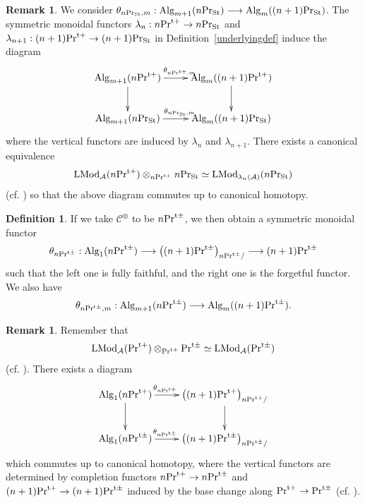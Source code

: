 \documentclass[leqno,12pt]{amsart}
\theoremstyle{plain}
\theoremstyle{definition}
\newtheorem{Definition}[Theorem]{Definition}
\newtheorem{Remark}[Theorem]{Remark}
\newcommand{\CCC}{\mathcal{C}}
\newcommand{\PR}{\textup{Pr}}
\newcommand{\PRTT}{\textup{Pr}^{\textup{t}+}}
\newcommand{\PRTTT}{\textup{Pr}^{\textup{t}\pm}}
\newcommand{\Alg}{\operatorname{Alg}}
\newcommand{\PRST}{\PR_{\textup{St}}}
\newcommand{\LMod}{\operatorname{LMod}}
\begin{document}
\begin{Remark}
\label{undermodule}
We consider $\theta_{n\PRST,m}:\Alg_{m+1}(n\PRST) \longrightarrow \Alg_{m}((n+1)\PRST)$.
The symmetric monoidal functors $\lambda_n:n\PRTT\to n\PRST$ and $\lambda_{n+1}:(n+1)\PRTT\to (n+1)\PRST$ in Definition~\ref{underlyingdef}
induce the diagram
\[
\xymatrix{
\Alg_{m+1}(n\PRTT) \ar[r]^{\theta_{n\PRTT,m}} \ar[d]& \Alg_{m}((n+1)\PRTT) \ar[d] \\
\Alg_{m+1}(n\PRST) \ar[r]^{\theta_{n\PRST,m}} & \Alg_{m}((n+1)\PRST)
}
\]
where the vertical functors are induced by $\lambda_n$ and $\lambda_{n+1}$.
There exists a canonical equivalence
\[
\LMod_{\mathcal{A}}(n\PRTT)\otimes_{n\PRTT}n\PRST\simeq \LMod_{\lambda_{n}(\mathcal{A})}(n\PRST)
\]
(cf. \cite[4.8.4.6]{HA})
so that 
the above diagram commutes up to canonical homotopy.
\end{Remark}

\begin{Definition}
If we take $\CCC^\otimes$ to be $n\PRTTT$, we then obtain a symmetric monoidal functor
\[
\theta_{n\PRTTT}:\Alg_1(n\PRTTT) \longrightarrow \big{(}(n+1)\PRTTT\big{)}_{n\PRTTT/}\longrightarrow (n+1)\PRTTT
\]
such that the left one is fully faithful, and the right one is the forgetful functor.
We also have
\[
\theta_{n\PRTTT,m}:\Alg_{m+1}(n\PRTTT) \longrightarrow \Alg_{m}((n+1)\PRTTT).
\]
\end{Definition}



\begin{Remark}
\label{comptheta}
Remember that 
\[
\LMod_{\mathcal{A}}(\PRTT)\otimes_{\PRTT}\PRTTT\simeq \LMod_{\mathcal{A}}(\PRTTT)
\]
(cf. \cite[4.8.4.6]{HA}).
There exists a diagram
\[
\xymatrix{
\Alg_{1}(n\PRTT) \ar[r]^(0.4){\theta_{n\PRTT}} \ar[d] & \big{(}(n+1)\PRTT\big{)}_{n\PRTT/} \ar[d] \\
\Alg_1(n\PRTTT) \ar[r]^(0.4){\theta_{n\PRTTT}} & \big{(}(n+1)\PRTTT\big{)}_{n\PRTTT/}
}
\]
which commutes up to canonical homotopy, where the vertical functors are determined by
completion functors $n\PRTT\to n\PRTTT$ and $(n+1)\PRTT\to (n+1)\PRTTT$
induced by the base change along $\PRTT\to \PRTTT$ (cf. \cite[4.8.5.1]{HA}).
\end{Remark}
\end{document}
